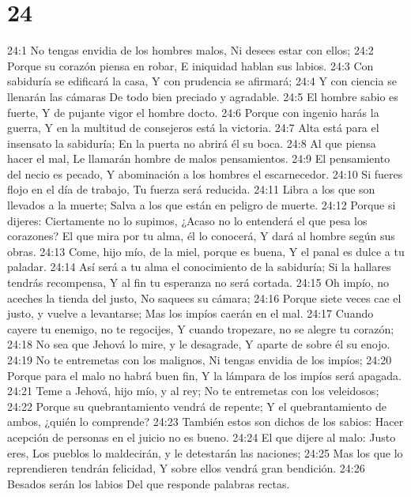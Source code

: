 \chapter{24}


24:1 No tengas envidia de los hombres malos,  
Ni desees estar con ellos;  
24:2 Porque su corazón piensa en robar,  
E iniquidad hablan sus labios.  
24:3 Con sabiduría se edificará la casa,  
Y con prudencia se afirmará;  
24:4 Y con ciencia se llenarán las cámaras  
De todo bien preciado y agradable.  
24:5 El hombre sabio es fuerte,  
Y de pujante vigor el hombre docto.  
24:6 Porque con ingenio harás la guerra,  
Y en la multitud de consejeros está la victoria.  
24:7 Alta está para el insensato la sabiduría;  
En la puerta no abrirá él su boca.  
24:8 Al que piensa hacer el mal,  
Le llamarán hombre de malos pensamientos.  
24:9 El pensamiento del necio es pecado,  
Y abominación a los hombres el escarnecedor.  
24:10 Si fueres flojo en el día de trabajo,  
Tu fuerza será reducida.  
24:11 Libra a los que son llevados a la muerte;  
Salva a los que están en peligro de muerte.  
24:12 Porque si dijeres: Ciertamente no lo supimos,  
¿Acaso no lo entenderá el que pesa los corazones?  
El que mira por tu alma, él lo conocerá,  
Y dará al hombre según sus obras.  
24:13 Come, hijo mío, de la miel, porque es buena,  
Y el panal es dulce a tu paladar.  
24:14 Así será a tu alma el conocimiento de la sabiduría;  
Si la hallares tendrás recompensa,  
Y al fin tu esperanza no será cortada.  
24:15 Oh impío, no aceches la tienda del justo,  
No saquees su cámara;  
24:16 Porque siete veces cae el justo, y vuelve a levantarse;  
Mas los impíos caerán en el mal.  
24:17 Cuando cayere tu enemigo, no te regocijes,  
Y cuando tropezare, no se alegre tu corazón;  
24:18 No sea que Jehová lo mire, y le desagrade,  
Y aparte de sobre él su enojo.  
24:19 No te entremetas con los malignos,  
Ni tengas envidia de los impíos;  
24:20 Porque para el malo no habrá buen fin,  
Y la lámpara de los impíos será apagada.  
24:21 Teme a Jehová, hijo mío, y al rey;  
No te entremetas con los veleidosos;  
24:22 Porque su quebrantamiento vendrá de repente;  
Y el quebrantamiento de ambos,  
¿quién lo comprende?  
24:23 También estos son dichos de los sabios:  
Hacer acepción de personas en el juicio no es bueno.  
24:24 El que dijere al malo: Justo eres,  
Los pueblos lo maldecirán, y le detestarán las naciones;  
24:25 Mas los que lo reprendieren tendrán felicidad,  
Y sobre ellos vendrá gran bendición.  
24:26 Besados serán los labios  
Del que responde palabras rectas.  
